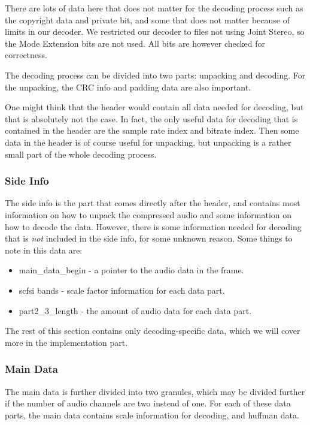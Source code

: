 \documentclass[a4paper,12pt]{article}
\begin{document}
            There are lots of data here that does not matter for the decoding
            process such as the copyright data and private bit, and
            some that does not matter because of limits in our
            decoder. We restricted our decoder to files not using Joint Stereo,
            so the Mode Extension bits are not used. All bits are however
            checked for correctness.

            The decoding process can be divided into two parts: unpacking and
            decoding. For the unpacking, the CRC info and padding data are also
            important.

            One might think that the header would contain all data needed for
            decoding, but that is absolutely not the case. In fact, the only
            useful data for decoding that is contained in the header are the
            sample rate index and bitrate index. Then some data in the header is
            of course useful for unpacking, but unpacking is a rather small part
            of the whole decoding process.

       \subsubsection{Side Info}
            The side info is the part that comes directly after the header, and
            contains most information on how to unpack the compressed audio and
            some information on how to decode the data. However, there is some
            information needed for decoding that is \textit{not} included in the
            side info, for some unknown reason. Some things to note in this data
            are:
            \begin{itemize}
                \item main\_data\_begin - a pointer to the audio data in the
                frame.
                \item scfsi bands - scale factor information for each data part.
                \item part2\_3\_length - the amount of audio data for each
                      data part.
            \end{itemize}
            The rest of this section contains only decoding-specific data, which
            we will cover more in the implementation part.

       \subsubsection{Main Data}
            The main data is further divided into two granules, which may be
            divided further if the number of audio channels are two instead of
            one. For each of these data parts, the main data contains scale
            information for decoding, and huffman data.
\end{document}
